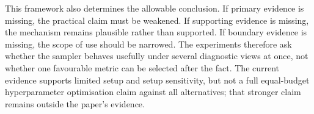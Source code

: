 This framework also determines the allowable conclusion. If primary evidence
is missing, the practical claim must be weakened. If supporting evidence is
missing, the mechanism remains plausible rather than supported. If boundary
evidence is missing, the scope of use should be narrowed. The experiments
therefore ask whether the sampler behaves usefully under several diagnostic
views at once, not whether one favourable metric can be selected after the
fact. The current evidence supports limited setup and setup sensitivity, but
not a full equal-budget hyperparameter optimisation claim against all
alternatives; that stronger claim remains outside the paper's evidence.

